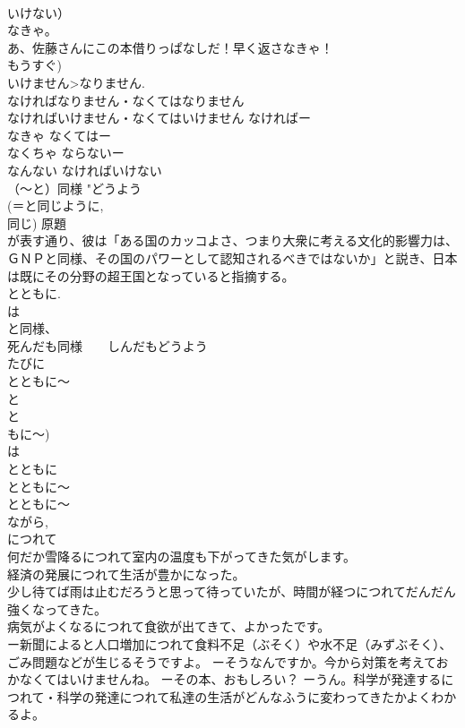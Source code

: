 \documentclass[8pt]{extreport}
\begin{document}
\begin{CJK}{UTF8}{min}
\\	いけない） 
\\	なきゃ。 
\\	あ、佐藤さんにこの本借りっぱなしだ！早く返さなきゃ！ 
\\	もうすぐ) 
\\	いけません>なりません. 
\\	なければなりません・なくてはなりません 
\\	なければいけません・なくてはいけません なければー
\\	なきゃ なくてはー
\\	なくちゃ ならないー
\\	なんない なければいけない 
\\	（～と）同様	"どうよう 
\\	(＝と同じように, 
\\	同じ) 原題
\\	が表す通り、彼は「ある国のカッコよさ、つまり大衆に考える文化的影響力は、ＧＮＰと同様、その国のパワーとして認知されるべきではないか」と説き、日本は既にその分野の超王国となっていると指摘する。 
\\	とともに. 
\\	は
\\	と同様、
\\	死んだも同様　　しんだもどうよう 
\\	たびに
\\	とともに～ 
\\	と 
\\	と
\\	もに～) 
\\	は
\\	とともに
\\	とともに～ 
\\	とともに～ 
\\	ながら, 
\\	につれて 
\\	何だか雪降るにつれて室内の温度も下がってきた気がします。 
\\	経済の発展につれて生活が豊かになった。 
\\	少し待てば雨は止むだろうと思って待っていたが、時間が経つにつれてだんだん強くなってきた。 
\\	病気がよくなるにつれて食欲が出てきて、よかったです。 
\\	ー新聞によると人口増加につれて食料不足（ぶそく）や水不足（みずぶそく）、ごみ問題などが生じるそうですよ。 ーそうなんですか。今から対策を考えておかなくてはいけませんね。 ーその本、おもしろい？ ーうん。科学が発達するにつれて・科学の発達につれて私達の生活がどんなふうに変わってきたかよくわかるよ。

\end{CJK}
\end{document}
